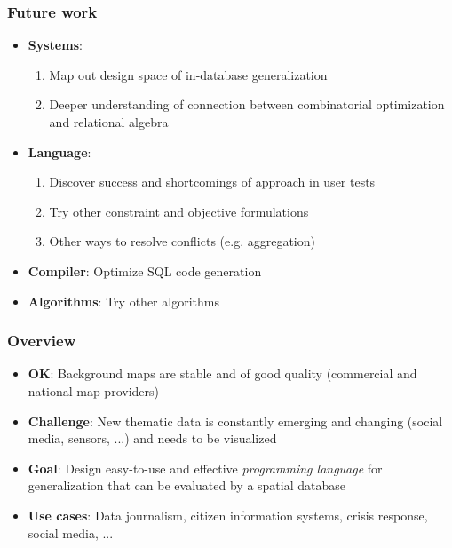 \documentclass{beamer}
\begin{document}
\frame
{
  \frametitle{Future work}
  \begin{itemize}
  \item \textbf{Systems}: 
  \begin{enumerate}
    \item Map out design space of in-database generalization
    \item Deeper understanding of connection between combinatorial optimization and relational algebra
  \end{enumerate}
  \item \textbf{Language}: 
  \begin{enumerate}
  	\item Discover success and shortcomings of approach in user tests
  	\item Try other constraint and objective formulations
  	\item Other ways to resolve conflicts (e.g. aggregation)
  \end{enumerate}
  \item \textbf{Compiler}: Optimize SQL code generation
  \item \textbf{Algorithms}: Try other algorithms
  \end{itemize}
  
  \begin{center}
  \end{center}

}








\frame
{
  \frametitle{Overview}
  \begin{center}
  \end{center}
  
  \begin{itemize}
  \item \textbf{OK}: Background maps are stable and of good quality (commercial and national map providers)
  \item \textbf{Challenge}: New thematic data is constantly emerging and changing (social media, sensors, ...) and needs to be visualized
  \item \textbf{Goal}: Design easy-to-use and effective \emph{programming language} for generalization that can be evaluated by a spatial database  \item \textbf{Use cases}: Data journalism, citizen information systems, crisis response, social media, ...
  \end{itemize}
}
\end{document}
